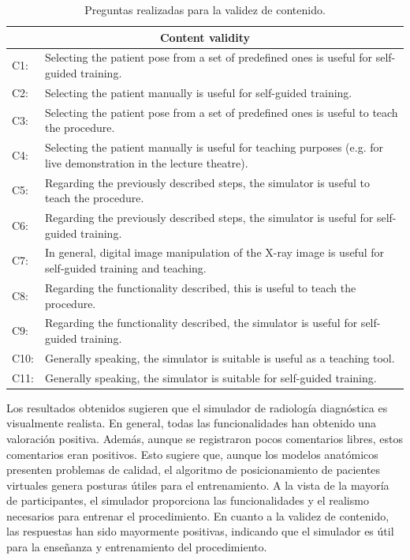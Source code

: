\begin{table}[ht]
    \centering
    \begin{tabular}{lp{14cm}}
    \hline
    \multicolumn{2}{c}{Content validity }
    \\
    \hline
    C1:     &  Selecting the patient pose from a set of predefined ones is useful for self-guided training.  \\
    C2:     & Selecting the patient manually is useful for self-guided training.   \\
    C3:     & Selecting the patient pose from a set of predefined ones is useful to teach the procedure.   \\
    C4:     & Selecting the patient manually is useful for teaching purposes (e.g. for live demonstration in the lecture theatre).    \\
    C5:     &  Regarding the previously described steps, the simulator is useful to teach the procedure.  \\
    C6:     & Regarding the previously described steps, the simulator is useful for self-guided training.  \\
    C7:     & In general, digital image manipulation of the X-ray image is useful for self-guided training and teaching.  \\
    C8:     & Regarding the functionality described, this is useful to teach the procedure.   \\
    C9:     & Regarding the functionality described, the simulator is useful  for self-guided training.  \\
    C10:     & Generally speaking, the simulator is suitable is useful as a teaching tool.   \\
    C11:     & Generally speaking, the simulator is suitable for self-guided training.   \\
    \hline
    \end{tabular}
    \caption{Preguntas realizadas para la validez de contenido.}
    \label{tab:contentvalidity}
\end{table}

Los resultados obtenidos sugieren que el simulador de radiología diagnóstica es visualmente realista. En general, todas las funcionalidades han obtenido una valoración positiva. Además, aunque se registraron pocos comentarios libres, estos comentarios eran positivos. Esto sugiere que, aunque los modelos anatómicos presenten problemas de calidad, el algoritmo de posicionamiento de pacientes virtuales genera posturas útiles para el entrenamiento. A la vista de la mayoría de participantes, el simulador proporciona las funcionalidades y el realismo necesarios para entrenar el procedimiento. En cuanto a la validez de contenido, las respuestas han sido mayormente positivas, indicando que el simulador es útil para la enseñanza y entrenamiento del procedimiento. 

